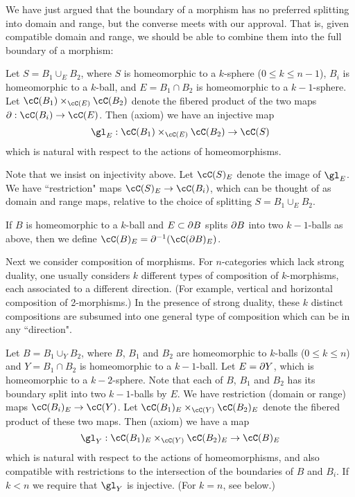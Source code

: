 We have just argued that the boundary of a morphism has no preferred splitting into
domain and range, but the converse meets with our approval.
That is, given compatible domain and range, we should be able to combine them into
the full boundary of a morphism:

{Let $S = B_1 \cup_E B_2$, where $S$ is homeomorphic to a $k$-sphere ($0\le k\le n-1$),
$B_i$ is homeomorphic to a $k$-ball, and $E = B_1\cap B_2$ is homeomorphic to  a $k{-}1$-sphere.
Let $\cC(B_1) \times_{\cC(E)} \cC(B_2)$ denote the fibered product of the 
two maps $\bd: \cC(B_i)\to \cC(E)$.
Then (axiom) we have an injective map
\[
	\gl_E : \cC(B_1) \times_{\cC(E)} \cC(B_2) \to \cC(S)
\]
which is natural with respect to the actions of homeomorphisms.}

Note that we insist on injectivity above.
Let $\cC(S)_E$ denote the image of $\gl_E$.
We have ``restriction" maps $\cC(S)_E \to \cC(B_i)$, which can be thought of as
domain and range maps, relative to the choice of splitting $S = B_1 \cup_E B_2$.

If $B$ is homeomorphic to a $k$-ball and $E \subset \partial B$ splits $\partial B$ into two $k{-}1$-balls
as above, then we define $\cC(B)_E = \bd^{-1}(\cC(\bd B)_E)$.

Next we consider composition of morphisms.
For $n$-categories which lack strong duality, one usually considers
$k$ different types of composition of $k$-morphisms, each associated to a different direction.
(For example, vertical and horizontal composition of 2-morphisms.)
In the presence of strong duality, these $k$ distinct compositions are subsumed into 
one general type of composition which can be in any ``direction".

{Let $B = B_1 \cup_Y B_2$, where $B$, $B_1$ and $B_2$ are homeomorphic to $k$-balls ($0\le k\le n$)
and $Y = B_1\cap B_2$ is homeomorphic to a $k{-}1$-ball.
Let $E = \partial Y$, which is homeomorphic to a $k{-}2$-sphere.
Note that each of $B$, $B_1$ and $B_2$ has its boundary split into two $k{-}1$-balls by $E$.
We have restriction (domain or range) maps $\cC(B_i)_E \to \cC(Y)$.
Let $\cC(B_1)_E \times_{\cC(Y)} \cC(B_2)_E$ denote the fibered product of these two maps. 
Then (axiom) we have a map
\[
	\gl_Y : \cC(B_1)_E \times_{\cC(Y)} \cC(B_2)_E \to \cC(B)_E
\]
which is natural with respect to the actions of homeomorphisms, and also compatible with restrictions
to the intersection of the boundaries of $B$ and $B_i$.
If $k < n$ we require that $\gl_Y$ is injective.
(For $k=n$, see below.)}



